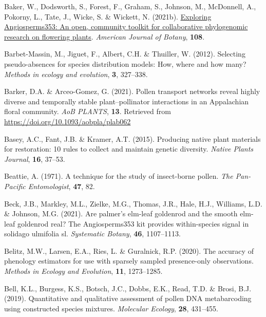 \documentclass[
]{article}
\newlength{\cslhangindent}
\newlength{\cslentryspacingunit} %
\newenvironment{CSLReferences}[2] %
 {%
  \setlength{\parindent}{0pt}
  \ifodd #1
  \let\oldpar\par
  \def\par{\hangindent=\cslhangindent\oldpar}
  \fi
  \setlength{\parskip}{#2\cslentryspacingunit}
 }%
 {}
\begin{document}
\begin{CSLReferences}{1}{0}
\leavevmode{}%
Baker, W., Dodsworth, S., Forest, F., Graham, S., Johnson, M.,
McDonnell, A., Pokorny, L., Tate, J., Wicke, S. \& Wickett, N. (2021b).
\href{https://doi.org/10.1002/ajb2.1703}{Exploring Angiosperms353: An
open, community toolkit for collaborative phylogenomic research on
flowering plants}. \emph{American Journal of Botany}, \textbf{108}.

\leavevmode{}%
Barbet-Massin, M., Jiguet, F., Albert, C.H. \& Thuiller, W. (2012).
Selecting pseudo-absences for species distribution models: How, where
and how many? \emph{Methods in ecology and evolution}, \textbf{3},
327--338.

\leavevmode{}%
Barker, D.A. \& Arceo-Gomez, G. (2021). {Pollen transport networks
reveal highly diverse and temporally stable plant--pollinator
interactions in an Appalachian floral community}. \emph{AoB PLANTS},
\textbf{13}. Retrieved from \url{https://doi.org/10.1093/aobpla/plab062}

\leavevmode{}%
Basey, A.C., Fant, J.B. \& Kramer, A.T. (2015). Producing native plant
materials for restoration: 10 rules to collect and maintain genetic
diversity. \emph{Native Plants Journal}, \textbf{16}, 37--53.

\leavevmode{}%
Beattie, A. (1971). A technique for the study of insect-borne pollen.
\emph{The Pan-Pacific Entomologist}, \textbf{47}, 82.

\leavevmode{}%
Beck, J.B., Markley, M.L., Zielke, M.G., Thomas, J.R., Hale, H.J.,
Williams, L.D. \& Johnson, M.G. (2021). Are palmer's elm-leaf goldenrod
and the smooth elm-leaf goldenrod real? The Angiosperms353 kit provides
within-species signal in solidago ulmifolia sl. \emph{Systematic
Botany}, \textbf{46}, 1107--1113.

\leavevmode{}%
Belitz, M.W., Larsen, E.A., Ries, L. \& Guralnick, R.P. (2020). The
accuracy of phenology estimators for use with sparsely sampled
presence-only observations. \emph{Methods in Ecology and Evolution},
\textbf{11}, 1273--1285.

\leavevmode{}%
Bell, K.L., Burgess, K.S., Botsch, J.C., Dobbs, E.K., Read, T.D. \&
Brosi, B.J. (2019). Quantitative and qualitative assessment of pollen
DNA metabarcoding using constructed species mixtures. \emph{Molecular
Ecology}, \textbf{28}, 431--455.


\end{CSLReferences}
\end{document}
